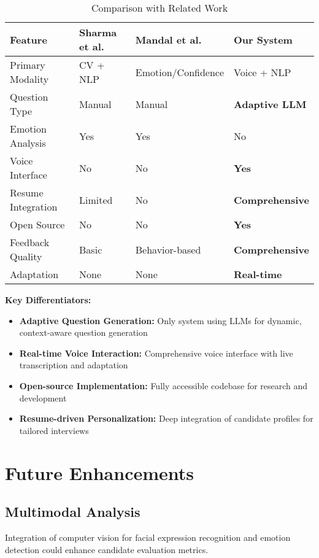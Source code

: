 \documentclass[conference]{IEEEtran}
\begin{document}
\begin{table}[htbp]
\centering
\caption{Comparison with Related Work}
\label{tab:comparison}
\footnotesize
\begin{tabular}{p{2.5cm}p{2.5cm}p{2.5cm}p{2.5cm}}
\toprule
\textbf{Feature} & \textbf{Sharma et al. \cite{sharma2025cv}} & \textbf{Mandal et al. \cite{mandal2023emotion}} & \textbf{Our System} \\
\midrule
Primary Modality & CV + NLP & Emotion/Confidence & Voice + NLP \\
\midrule
Question Type & Manual & Manual & \textbf{Adaptive LLM} \\
\midrule
Emotion Analysis & Yes & Yes & No \\
\midrule
Voice Interface & No & No & \textbf{Yes} \\
\midrule
Resume Integration & Limited & No & \textbf{Comprehensive} \\
\midrule
Open Source & No & No & \textbf{Yes} \\
\midrule
Feedback Quality & Basic & Behavior-based & \textbf{Comprehensive} \\
\midrule
Adaptation & None & None & \textbf{Real-time} \\
\bottomrule
\end{tabular}
\end{table}

\textbf{Key Differentiators:}
\begin{itemize}
\item \textbf{Adaptive Question Generation:} Only system using LLMs for dynamic, context-aware question generation
\item \textbf{Real-time Voice Interaction:} Comprehensive voice interface with live transcription and adaptation
\item \textbf{Open-source Implementation:} Fully accessible codebase for research and development
\item \textbf{Resume-driven Personalization:} Deep integration of candidate profiles for tailored interviews
\end{itemize}

\section{Future Enhancements}

\subsection{Multimodal Analysis}
Integration of computer vision for facial expression recognition and emotion detection could enhance candidate evaluation metrics.
\end{document}
